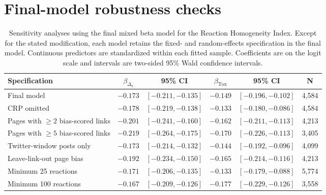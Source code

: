 \documentclass[10pt]{article}
\begin{document}
\section*{Final-model robustness checks}
\begin{table}[htb]
\centering
\footnotesize
\setlength{\tabcolsep}{3pt}
\caption{Sensitivity analyses using the final mixed beta model for the
Reaction Homogeneity Index. Except for the stated modification, each model
retains the fixed- and random-effects specification in
the final model. Continuous predictors are standardized within
each fitted sample. Coefficients are on the logit scale and intervals are
two-sided 95\% Wald confidence intervals.}
\label{tab:robustness_final}
\begin{tabular}{p{3.7cm}ccccc}
\toprule
\textbf{Specification} & $\beta_{\Delta_b}$ & \textbf{95\% CI}
& $\beta_{\mathrm{Tox}}$ & \textbf{95\% CI} & \textbf{N} \\
\midrule
Final model & $-0.173$ & $[-0.211, -0.135]$ & $-0.149$ & $[-0.196, -0.102]$ & 4,584 \\
CRP omitted & $-0.178$ & $[-0.219, -0.138]$ & $-0.133$ & $[-0.180, -0.086]$ & 4,584 \\
Pages with $\geq 2$ bias-scored links & $-0.201$ & $[-0.241, -0.160]$ & $-0.162$ & $[-0.211, -0.113]$ & 4,213 \\
Pages with $\geq 5$ bias-scored links & $-0.219$ & $[-0.264, -0.175]$ & $-0.170$ & $[-0.226, -0.113]$ & 3,405 \\
Twitter-window posts only & $-0.173$ & $[-0.214, -0.132]$ & $-0.144$ & $[-0.192, -0.096]$ & 4,099 \\
Leave-link-out page bias & $-0.192$ & $[-0.234, -0.150]$ & $-0.165$ & $[-0.214, -0.116]$ & 4,213 \\
Minimum 25 reactions & $-0.171$ & $[-0.206, -0.135]$ & $-0.133$ & $[-0.179, -0.088]$ & 5,774 \\
Minimum 100 reactions & $-0.167$ & $[-0.209, -0.126]$ & $-0.177$ & $[-0.229, -0.126]$ & 3,558 \\
\bottomrule
\end{tabular}
\end{table}
\end{document}

